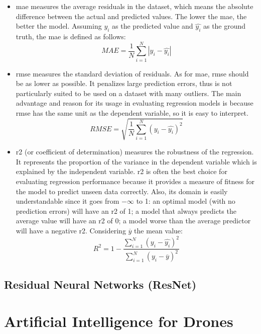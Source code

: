 \begin{itemize}
	\item \gls{mae} measures the average residuals in the dataset, which means the absolute difference between the actual and predicted values. The lower the \gls{mae}, the better the model. Assuming $y_i$ as the predicted value and $\hat{y_i}$ as the ground truth, the \gls{mae} is defined as follows:
	$$ MAE = \frac{1}{N} \sum_{i=1}^N |y_i - \hat{y_i}| $$
	
	\item \gls{rmse} measures the standard deviation of residuals. As for \gls{mae}, \gls{rmse} should be as lower as possible. It penalizes large prediction errors, thus is not particularly suited to be used on a dataset with many outliers. The main advantage and reason for its usage in evaluating regression models is because \gls{rmse} has the same unit as the dependent variable, so it is easy to interpret.
	$$ RMSE = \sqrt{\frac{1}{N} \sum_{i=1}^N (y_i - \hat{y_i})^2} $$
	
	\item \gls{r2} (or coefficient of determination) measures the robustness of the regression. It represents the proportion of the variance in the dependent variable which is explained by the independent variable. \gls{r2} is often the best choice for evaluating regression performance because it provides a measure of fitness for the model to predict unseen data correctly. Also, its domain is easily understandable since it goes from $-\infty$ to 1: an optimal model (with no prediction errors) will have an \gls{r2} of 1; a model that always predicts the average value will have an \gls{r2} of 0; a model worse than the average predictor will have a negative \gls{r2}. Considering $\overline{y}$ the mean value:
	$$ R^2 = 1 - \frac{\sum_{i=1}^N (y_i - \hat{y_i})^2}{\sum_{i=1}^N (y_i - \overline{y})^2} $$
\end{itemize}



\subsection{Residual Neural Networks (ResNet)}
\label{subsec:resnet}




\section{Artificial Intelligence for Drones}
\label{sec:human-drone-interaction}

